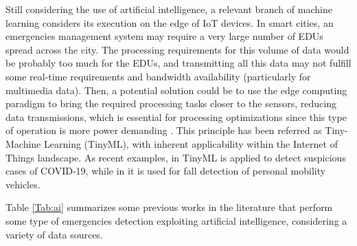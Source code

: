 \begin{refsection}
Still considering the use of artificial intelligence, a relevant branch of machine learning considers its execution on the edge of IoT devices. In smart cities, an emergencies management system may require a very large number of EDUs spread across the city. The processing requirements for this volume of data would be probably too much for the EDUs, and transmitting all this data may not fulfill some real-time requirements and bandwidth availability (particularly for multimedia data). Then, a potential solution could be to use the edge computing paradigm to bring the required processing tasks closer to the sensors, reducing data transmissions, which is essential for processing optimizations since this type of operation is more power demanding \cite{TinyMachinePavementAnomalies}. This principle has been referred as Tiny-Machine Learning (TinyML), with inherent applicability within the Internet of Things landscape. As recent examples, in \cite{TinyMachineCovid} TinyML is applied to detect suspicious cases of COVID-19, while in \cite{TinyMachineFall} it is used for fall detection of personal mobility vehicles.

Table \ref{Tab:ai} summarizes some previous works in the literature that perform some type of emergencies detection exploiting artificial intelligence, considering a variety of data sources.

\begin{table}
  \centering
  \caption{Detecting emergencies in urban areas by artificial intelligence algorithms.}\label{Tab:ai}
\end{table}
\end{refsection}
